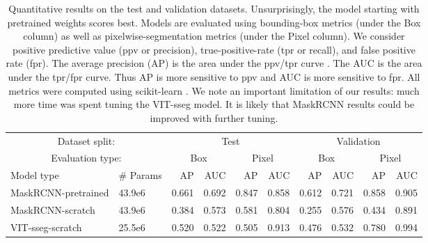 \documentclass[10pt,twocolumn,letterpaper]{article}
\begin{document}
\begin{table*}[t]
\centering
\begin{tabular}{ll|rrrr|rrrr}
\toprule
\multicolumn{2}{c}{Dataset split:} & \multicolumn{4}{c}{Test} & \multicolumn{4}{c}{Validation} \\
\multicolumn{2}{c}{Evaluation type:} & \multicolumn{2}{c}{Box} & \multicolumn{2}{c}{Pixel} & \multicolumn{2}{c}{Box} & \multicolumn{2}{c}{Pixel} \\
Model type &  \# Params & AP & AUC & AP & AUC & AP & AUC & AP & AUC \\
\midrule
MaskRCNN-pretrained &  43.9e6 &  0.661 &   0.692 &    0.847 &     0.858 &  0.612 &   0.721 &    0.858 &     0.905 \\
MaskRCNN-scratch    &  43.9e6 &  0.384 &   0.573 &    0.581 &     0.804 &  0.255 &   0.576 &    0.434 &     0.891 \\
VIT-sseg-scratch    &  25.5e6 &  0.520 &   0.522 &    0.505 &     0.913 &  0.476 &   0.532 &    0.780 &     0.994 \\
\bottomrule
\end{tabular}
\caption[]{
    Quantitative results on the test and validation datasets.
    Unsurprisingly, the model starting with pretrained weights scores best.
    Models are evaluated using bounding-box metrics (under the Box column) as well as pixelwise-segmentation
      metrics (under the Pixel column).
    We consider positive predictive value (ppv or precision), true-positive-rate (tpr or recall), and false positive rate (fpr).
    The average precision (AP) is the area under the ppv/tpr curve \cite{powers_evaluation_2011}.
    The AUC is the area under the tpr/fpr curve.
    Thus AP is more sensitive to ppv and AUC is more sensitive to fpr.
    All metrics were computed using scikit-learn \cite{scikit-learn}.
    We note an important limitation of our results:
    much more time was spent tuning the VIT-sseg model.
    It is likely that MaskRCNN results could be improved with further tuning.
}
\label{tab:model_results}
\end{table*}
\end{document}
